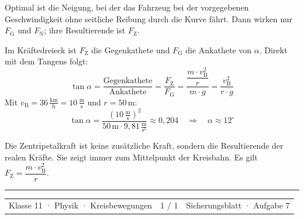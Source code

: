 \documentclass[10pt,a4paper]{article}
\makeatletter
\newcommand{\sectiontitle}[1]{\vspace{7mm}{\color{Blue}\bfseries\large #1}\par\vspace{1mm}{\color{Blue}\rule{\linewidth}{0.7pt}}\par\vspace{3mm}}
\newcommand{\unit}[1]{\,\mathrm{#1}}
\newcommand{\unitfrac}[2]{\,\frac{\mathrm{#1}}{\mathrm{#2}}}
\newcommand{\pagefooter}[1]{\vfill{\color{Line}\rule{\linewidth}{0.5pt}}\par\vspace{1mm}\begin{tabularx}{\linewidth}{@{}Xc r@{}}{\leavevmode\small\color{Muted}Klasse 11 · Physik · Kreisbewegungen} & {\leavevmode\small\color{Muted}#1} & {\leavevmode\small\color{Muted}Sicherungsblatt · Aufgabe 7}\end{tabularx}}
\newcommand{\compact}{\small\setlength{\baselineskip}{20pt}\setlength{\abovedisplayskip}{12pt}\setlength{\belowdisplayskip}{12pt}\setlength{\abovedisplayshortskip}{10pt}\setlength{\belowdisplayshortskip}{12pt}}
\makeatother
\begin{document}
\begin{minipage}[c]{0.57\linewidth}
\compact Optimal ist die Neigung, bei der das Fahrzeug bei der vorgegebenen Geschwindigkeit ohne seitliche Reibung durch die Kurve fährt. Dann wirken nur $F_{\mathrm G}$ und $F_{\mathrm N}$; ihre Resultierende ist $F_{\mathrm Z}$.

\vspace{0.8mm}
Im Kräftedreieck ist $F_{\mathrm Z}$ die Gegenkathete und $F_{\mathrm G}$ die Ankathete von $\alpha$. Direkt mit dem Tangens folgt:
\[
\tan\alpha=\frac{\text{Gegenkathete}}{\text{Ankathete}}
=\frac{F_{\mathrm Z}}{F_{\mathrm G}}
=\frac{\dfrac{m\cdot v_{\mathrm B}^{2}}{r}}{m\cdot g}
=\frac{v_{\mathrm B}^{2}}{r\cdot g}
\]
\vspace{0.8mm}
Mit $v_{\mathrm B}=36\unitfrac{km}{h}=10\unitfrac{m}{s}$ und $r=50\unit{m}$:
\[
\tan\alpha=\frac{\left(10\unitfrac{m}{s}\right)^{2}}{50\unit{m}\cdot9{,}81\unitfrac{m}{s^{2}}}\approx0{,}204\quad\Rightarrow\quad\alpha\approx12^{\circ}
\]
\end{minipage}

\par\vspace{1mm}\sectiontitle{3 · Merke}
\begin{tcolorbox}[sheetbox,colback=Mint]
\small\setlength{\baselineskip}{20pt} Die Zentripetalkraft ist keine zusätzliche Kraft, sondern die Resultierende der realen Kräfte. Sie zeigt immer zum Mittelpunkt der Kreisbahn. Es gilt $F_{\mathrm Z}=\dfrac{m\cdot v_{\mathrm B}^{2}}{r}$.
\end{tcolorbox}
\pagefooter{1 / 1}
\end{document}
